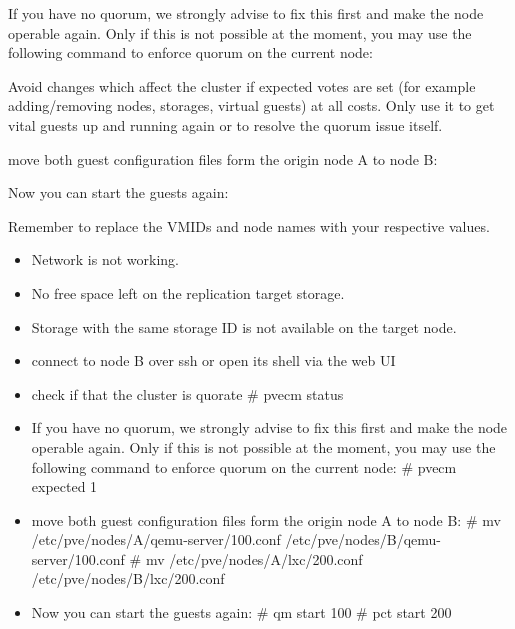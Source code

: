 If you have no quorum, we strongly advise to fix this first and make the node operable again. Only if this is not possible at the moment, you may use the following command to enforce quorum on the current node:

Avoid changes which affect the cluster if expected votes are set (for example adding/removing nodes, storages, virtual guests) at all costs. Only use it to get vital guests up and running again or to resolve the quorum issue itself.

move both guest configuration files form the origin node A to node B:

Now you can start the guests again:

Remember to replace the VMIDs and node names with your respective values.

\begin{itemize}[leftmargin=2cm]

	\item Network is not working.

	\item No free space left on the replication target storage.

	\item Storage with the same storage ID is not available on the target node.

\end{itemize}

\begin{itemize}[leftmargin=2cm]

	\item connect to node B over ssh or open its shell via the web UI

	\item check if that the cluster is quorate # pvecm status

	\item If you have no quorum, we strongly advise to fix this first and make the node operable again. Only if this is not possible at the moment, you may use the following command to enforce quorum on the current node: # pvecm expected 1

\end{itemize}

\begin{itemize}[leftmargin=2cm]

	\item move both guest configuration files form the origin node A to node B: # mv /etc/pve/nodes/A/qemu-server/100.conf /etc/pve/nodes/B/qemu-server/100.conf # mv /etc/pve/nodes/A/lxc/200.conf /etc/pve/nodes/B/lxc/200.conf

	\item Now you can start the guests again: # qm start 100 # pct start 200

\end{itemize}

